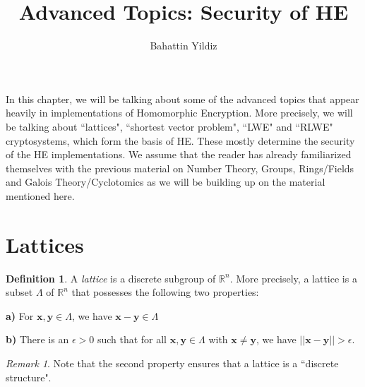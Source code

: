 \documentclass[12pt]{article}
\title{Advanced Topics: Security of HE}
\author{Bahattin Yildiz }
\theoremstyle{plain}
\theoremstyle{definition}
\newtheorem{definition}{Definition}
\theoremstyle{remark}
\newtheorem{remark}{Remark}
\begin{document}
\date{}

\maketitle
In this chapter, we will be talking about some of the advanced topics that appear heavily in implementations of Homomorphic Encryption. More precisely, we will be talking about ``lattices", ``shortest vector problem", ``LWE" and ``RLWE" cryptosystems, which form the basis of HE. These mostly determine the security of the HE implementations. We assume that the reader has already familiarized themselves with the previous material on Number Theory, Groups, Rings/Fields and Galois Theory/Cyclotomics as we will be building up on the material mentioned here.


 \section{Lattices}
\begin{definition}
A {\it lattice} is a discrete subgroup of $\mathbb{R}^n$. More precisely, a lattice is a subset $\Lambda$ of $\mathbb{R}^n$ that possesses the following two properties:
\par {\bf a)} For $\mathbf{x}, \mathbf{y} \in \Lambda$, we have $\mathbf{x}-\mathbf{y}\in \Lambda$
\par {\bf b)} There is an $\epsilon >0$ such that for all $\mathbf{x},\mathbf{y} \in \Lambda$ with $\mathbf{x}\neq \mathbf{y}$, we have $||\mathbf{x}-\mathbf{y}||>\epsilon$.
\end{definition}
\begin{remark}
Note that the second property ensures that a lattice is a ``discrete structure".
\end{remark}
\end{document}
